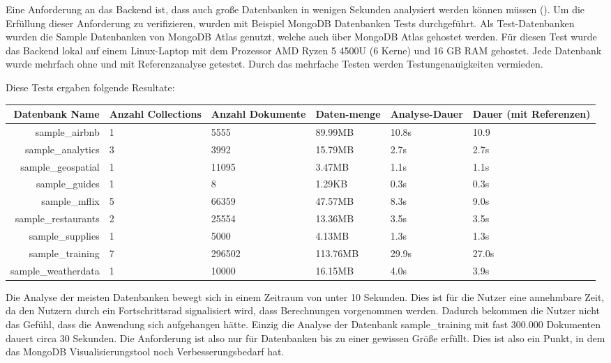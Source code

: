 Eine Anforderung an das Backend ist, dass auch große Datenbanken in wenigen Sekunden analysiert werden können müssen ().
Um die Erfüllung dieser Anforderung zu verifizieren, wurden mit Beispiel MongoDB Datenbanken Tests durchgeführt.
Als Test-Datenbanken wurden die Sample Datenbanken von MongoDB Atlas genutzt, welche auch über MongoDB Atlas gehostet werden.
Für diesen Test wurde das Backend lokal auf einem Linux-Laptop mit dem Prozessor AMD Ryzen 5 4500U (6 Kerne) und 16 GB RAM gehostet.
Jede Datenbank wurde mehrfach ohne und mit Referenzanalyse getestet.
Durch das mehrfache Testen werden Testungenauigkeiten vermieden.

Diese Tests ergaben folgende Resultate:

\begin{tabular}{ |r|m{1.5cm}|m{1.5cm}|m{2cm}|m{1.5cm}|m{2cm}| }
        \hline
        \textbf{Datenbank Name} & \textbf{Anzahl Collections} & \textbf{Anzahl Dokumente} & \textbf{Daten-menge} & \textbf{Analyse-Dauer} & \textbf{Dauer (mit Referenzen)}\\
        \hline
        sample\_airbnb & 1 & 5555 & 89.99MB & 10.8s & 10.9\\
        sample\_analytics & 3 & 3992 & 15.79MB & 2.7s & 2.7s\\
        sample\_geospatial & 1 & 11095 & 3.47MB & 1.1s & 1.1s\\
        sample\_guides & 1 & 8 & 1.29KB & 0.3s & 0.3s\\
        sample\_mflix & 5 & 66359 & 47.57MB & 8.3s & 9.0s\\
        sample\_restaurants & 2 & 25554 & 13.36MB & 3.5s & 3.5s\\
        sample\_supplies & 1 & 5000 & 4.13MB & 1.3s & 1.3s\\
        sample\_training & 7 & 296502 & 113.76MB & 29.9s & 27.0s\\
        sample\_weatherdata & 1 & 10000 & 16.15MB & 4.0s & 3.9s\\
        \hline
\end{tabular}

Die Analyse der meisten Datenbanken bewegt sich in einem Zeitraum von unter 10 Sekunden.
Dies ist für die Nutzer eine annehmbare Zeit, da den Nutzern durch ein Fortschrittsrad signalisiert wird, dass Berechnungen vorgenommen werden.
Dadurch bekommen die Nutzer nicht das Gefühl, dass die Anwendung sich aufgehangen hätte.
Einzig die Analyse der Datenbank sample\_training mit fast 300.000 Dokumenten dauert circa 30 Sekunden.
Die Anforderung  ist also  nur für Datenbanken bis zu einer gewissen Größe erfüllt.
Dies ist also ein Punkt, in dem das MongoDB Visualisierungstool noch Verbesserungsbedarf hat.

